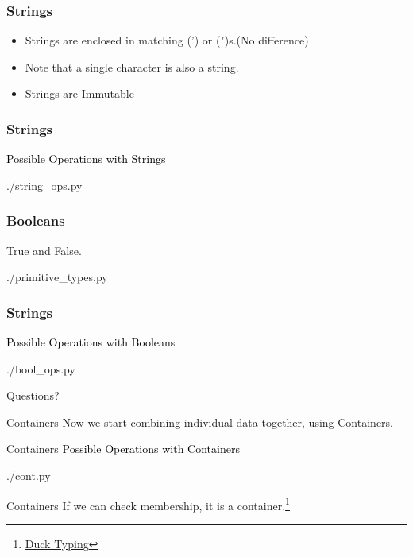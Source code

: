 \documentclass{beamer}
\begin{document}
\begin{frame}
  \frametitle{Strings}
  \begin{itemize}
    \item Strings are enclosed in matching (') or (")s.(No difference)
    \item Note that a single character is also a string.
    \item Strings are Immutable
  \end{itemize}
\end{frame}

\begin{frame}
  \frametitle{Strings}
  \textcolor{black}{\large{Possible Operations with Strings}}
  \begin{lstinputlisting}
    {./string_ops.py}
  \end{lstinputlisting}
\end{frame}

\begin{frame}
  \frametitle{Booleans}
  True and False.
  \begin{lstinputlisting}[firstline=14, lastline=15]
    {./primitive_types.py}
  \end{lstinputlisting}
\end{frame}

\begin{frame}
  \frametitle{Strings}
  \textcolor{black}{\large{Possible Operations with Booleans}}
  \begin{lstinputlisting}
    {./bool_ops.py}
  \end{lstinputlisting}
\end{frame}

\begin{frame}[plain, c]
  \begin{center}
    Questions?
  \end{center}
\end{frame}

\begin{frame}{Containers}
  Now we start combining individual data together,
  using Containers.
\end{frame}

\begin{frame}{Containers}
  \textcolor{black}{\large{Possible Operations with Containers}}
  \begin{lstinputlisting}
    {./cont.py}
  \end{lstinputlisting}
\end{frame}

\begin{frame}{Containers}
  If we can check membership, it is a
  container.\footnote{\footnotesize{\href{https://en.wikipedia.org/wiki/Duck\_typing}{Duck
  Typing}}}

\end{frame}
\end{document}
